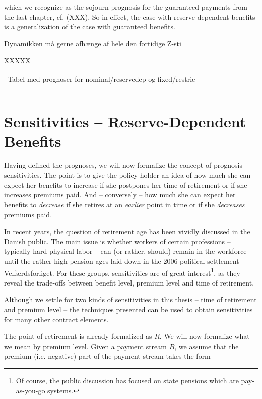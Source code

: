 \documentclass{article}
\newcommand{\1}[1]{\mathbbm{1}_{\left\lbrace #1 \right\rbrace}}
\theoremstyle{break}
\theoremstyle{remark}
\newenvironment{remark}
  {\pushQED{\qed}\renewcommand{\qedsymbol}{\scalebox{1.4}{$\circ$}}\remarkx}
  {\popQED\endremarkx}
\numberwithin{equation}{section}
\begin{document}
which we recognize as the sojourn prognosis for the guaranteed payments from the last chapter, cf. (XXX). So in effect, the case with reserve-dependent benefits is a generalization of the case with guaranteed benefits.

\begin{remark}
	Dynamikken må gerne afhænge af hele den fortidige Z-sti
\end{remark}



XXXXX
\begin{table}[]
	\begin{tabular}{lll}
	Tabel med prognoser for nominal/reservedep og fixed/restric	&  &  \\
		&  &  \\
		&  & 
	\end{tabular}
\end{table}

\newpage
\section{Sensitivities -- Reserve-Dependent Benefits}

Having defined the prognoses, we will now formalize the concept of prognosis sensitivities. The point is to give the policy holder an idea of how much she can expect her benefits to increase if she postpones her time of retirement or if she increases premiums paid. And -- conversely -- how much she can expect her benefits to \textit{decrease} if she retires at an \textit{earlier} point in time or if she \textit{decreases} premiums paid.

In recent years, the question of retirement age has been vividly discussed in the Danish public. The main issue is whether workers of certain professions -- typically hard physical labor -- can (or rather, should) remain in the workforce until the rather high pension ages laid down in the 2006 political settlement Velfærdsforliget. For these groups, sensitivities are of great interest\footnote{Of course, the public discussion has focused on state pensions which are pay-as-you-go systems.}, as they reveal the trade-offs between benefit level, premium level and time of retirement.

Although we settle for two kinds of sensitivities in this thesis -- time of retirement and premium level -- the techniques presented can be used to obtain sensitivities for many other contract elements.

The point of retirement is already formalized as $R$. We will now formalize what we mean by premium level. Given a payment stream $B$, we assume that the premium (i.e. negative) part of the payment stream takes the form
\end{document}
